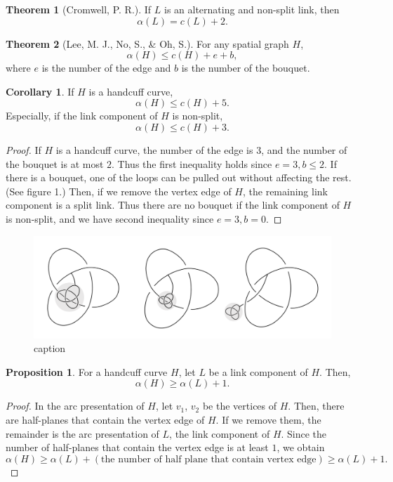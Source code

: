 \documentclass{article}
\theoremstyle{definition}
\theoremstyle{theorem}
\newtheorem{theorem}{Theorem}
\theoremstyle{proposition}
\newtheorem{prop}{Proposition}
\theoremstyle{corollary}
\newtheorem*{corol}{Corollary}
\begin{document}
\begin{theorem}[Cromwell, P. R.]
    If $L$ is an alternating and non-split link, then
    \[ \alpha(L) = c(L)+2. \]
\end{theorem}

\begin{theorem}[Lee, M. J., No, S., \& Oh, S.]
    For any spatial graph $H$,
    \[ \alpha(H) \leq c(H)+e+b, \]
    where $e$ is the number of the edge and $b$ is the number of the bouquet.
\end{theorem}

\begin{corol}
    If $H$ is a handcuff curve,
    \[ \alpha(H) \leq c(H)+5. \]
    Especially, if the link component of $H$ is non-split,
    \[ \alpha(H) \leq c(H)+3. \]
\end{corol}

\begin{proof}
    If $H$ is a handcuff curve, the number of the edge is $3$, and the number of the bouquet is at most $2$. Thus the first inequality holds since $e=3, b \leq 2$. If there is a bouquet, one of the loops can be pulled out without affecting the rest. (See figure 1.) Then, if we remove the vertex edge of $H$, the remaining link component is a split link. Thus there are no bouquet if the link component of $H$ is non-split, and we have second inequality since $e=3, b=0$.
\end{proof}

\begin{figure}
    \centerline{\includegraphics[width=\textwidth]{image.png}}
    \caption{caption}
    \label{figure_4} 
\end{figure}

\begin{prop}
    For a handcuff curve $H$, let $L$ be a link component of $H$. Then,
    \[ \alpha(H) \geq \alpha(L)+1. \]
\end{prop}
\begin{proof}
    In the arc presentation of $H$, let $v_1$, $v_2$ be the vertices of $H$. Then, there are half-planes that contain the vertex edge of $H$. If we remove them, the remainder is the arc presentation of $L$, the link component of $H$. Since the number of half-planes that contain the vertex edge is at least $1$, we obtain
    \[ \alpha(H) \geq \alpha(L) + (\text{the number of half plane that contain vertex edge}) \geq \alpha(L)+1. \]
\end{proof}
\end{document}

